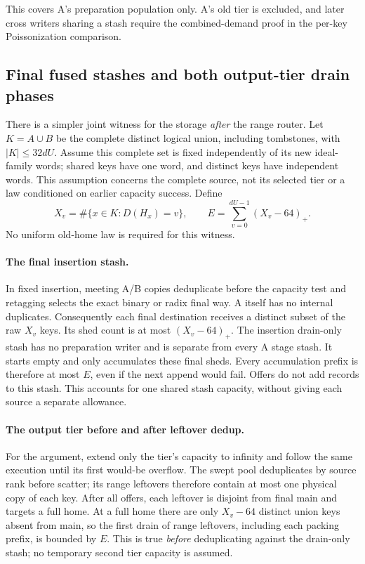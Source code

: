 \documentclass[11pt]{article}
\theoremstyle{definition}
\theoremstyle{remark}
\begin{document}
This covers A's preparation population only. A's old tier is excluded,
and later cross writers sharing a stash require the combined-demand proof
in the per-key Poissonization comparison.

\subsection{Final fused stashes and both output-tier drain phases}
\label{sec:final-drain-bound}
There is a simpler joint witness for the storage \emph{after} the range
router. Let $K=A\cup B$ be the complete distinct logical union, including
tombstones, with $|K|\le32dU$. Assume this complete set is fixed independently
of its new ideal-family words; shared keys have one word, and distinct keys
have independent words. This assumption concerns the complete source, not
its selected tier or a law conditioned on earlier capacity success. Define
\[
 X_v=\#\{x\in K:D(H_x)=v\},\qquad
 E=\sum_{v=0}^{dU-1}(X_v-64)_+.
\]
No uniform old-home law is required for this witness.

\paragraph{The final insertion stash.}
In fixed insertion, meeting A/B copies deduplicate before the capacity
test and retagging selects the exact binary or radix final way.
A itself has no internal duplicates.
Consequently each final destination receives a distinct subset of the raw
$X_v$ keys. Its shed count is at most $(X_v-64)_+$. The insertion drain-only
stash has no preparation writer and is separate from every A stage stash.
It starts empty and only accumulates these final sheds. Every accumulation
prefix is therefore at most $E$, even if the next append would fail.
Offers do not add records to this stash. This accounts for one shared stash
capacity, without giving each source a separate allowance.

\paragraph{The output tier before and after leftover dedup.}
For the argument, extend only the tier's capacity to infinity and follow
the same execution until its first would-be overflow. The swept pool
deduplicates by source rank before scatter; its range leftovers therefore
contain at most one physical copy of each key. After all offers, each
leftover is disjoint from final main and targets a full home. At a full
home there are only $X_v-64$ distinct union keys absent from main, so the
first drain of range leftovers, including each packing prefix, is bounded
by $E$. This is true \emph{before} deduplicating against the drain-only
stash; no temporary second tier capacity is assumed.
\end{document}
